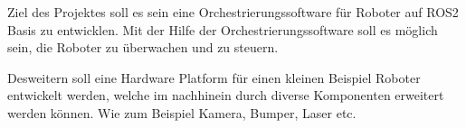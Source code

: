 \begin{flushleft}
    Ziel des Projektes soll es sein eine
    Orchestrierungssoftware für Roboter auf ROS2 Basis zu entwicklen.
    Mit der Hilfe der Orchestrierungssoftware soll es möglich sein, die Roboter zu überwachen und zu steuern.

    Desweitern soll eine Hardware Platform für einen kleinen Beispiel Roboter entwickelt werden, welche im
    nachhinein durch diverse Komponenten erweitert werden können. Wie zum Beispiel Kamera, Bumper, Laser etc.
\end{flushleft}